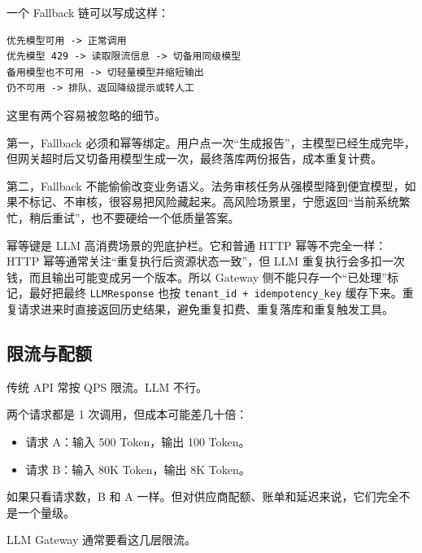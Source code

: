 \documentclass[9pt,a4paper,twocolumn]{ctexart}
\begin{document}
一个 Fallback 链可以写成这样：



\begin{lstlisting}
优先模型可用 -> 正常调用
优先模型 429 -> 读取限流信息 -> 切备用同级模型
备用模型也不可用 -> 切轻量模型并缩短输出
仍不可用 -> 排队、返回降级提示或转人工
\end{lstlisting}



这里有两个容易被忽略的细节。



第一，Fallback 必须和幂等绑定。用户点一次“生成报告”，主模型已经生成完毕，但网关超时后又切备用模型生成一次，最终落库两份报告，成本重复计费。



第二，Fallback 不能偷偷改变业务语义。法务审核任务从强模型降到便宜模型，如果不标记、不审核，很容易把风险藏起来。高风险场景里，宁愿返回“当前系统繁忙，稍后重试”，也不要硬给一个低质量答案。



幂等键是 LLM 高消费场景的兜底护栏。它和普通 HTTP 幂等不完全一样：HTTP 幂等通常关注“重复执行后资源状态一致”，但 LLM 重复执行会多扣一次钱，而且输出可能变成另一个版本。所以 Gateway 侧不能只存一个“已处理”标记，最好把最终 \texttt{LLMResponse} 也按 \texttt{tenant\_id + idempotency\_key} 缓存下来。重复请求进来时直接返回历史结果，避免重复扣费、重复落库和重复触发工具。



\subsection*{限流与配额}


传统 API 常按 QPS 限流。LLM 不行。



两个请求都是 1 次调用，但成本可能差几十倍：


\begin{itemize}[itemsep=1pt, topsep=2pt]
  \item 请求 A：输入 500 Token，输出 100 Token。
  \item 请求 B：输入 80K Token，输出 8K Token。
\end{itemize}


如果只看请求数，B 和 A 一样。但对供应商配额、账单和延迟来说，它们完全不是一个量级。



LLM Gateway 通常要看这几层限流。
\end{document}
